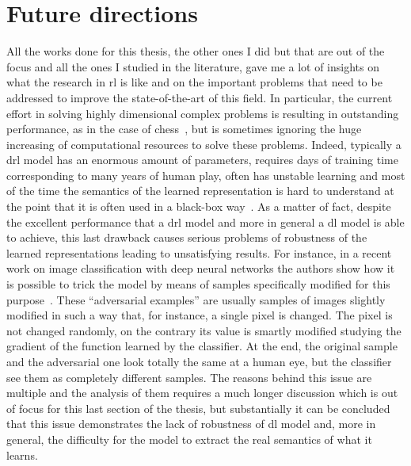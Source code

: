 \section{Future directions}
All the works done for this thesis, the other ones I did but that are out of the focus and all the ones I studied in the literature, gave me a lot of insights on what the research in \gls{rl} is like and on the important problems that need to be addressed to improve the state-of-the-art of this field. In particular, the current effort in solving highly dimensional complex problems is resulting in outstanding performance, as in the case of chess~\cite{silver2017chess}, but is sometimes ignoring the huge increasing of computational resources to solve these problems. Indeed, typically a \gls{drl} model has an enormous amount of parameters, requires days of training time corresponding to many years of human play, often has unstable learning and most of the time the semantics of the learned representation is hard to understand at the point that it is often used in a black-box way~\cite{mnih2015human}. As a matter of fact, despite the excellent performance that a \gls{drl} model and more in general a \gls{dl} model is able to achieve, this last drawback causes serious problems of robustness of the learned representations leading to unsatisfying results. For instance, in a recent work on image classification with deep neural networks the authors show how it is possible to trick the model by means of samples specifically modified for this purpose~\cite{yuan2017adversarial}. These ``adversarial examples'' are usually samples of images slightly modified in such a way that, for instance, a single pixel is changed. The pixel is not changed randomly, on the contrary its value is smartly modified studying the gradient of the function learned by the classifier. At the end, the original sample and the adversarial one look totally the same at a human eye, but the classifier see them as completely different samples. The reasons behind this issue are multiple and the analysis of them requires a much longer discussion which is out of focus for this last section of the thesis, but substantially it can be concluded that this issue demonstrates the lack of robustness of \gls{dl} model and, more in general, the difficulty for the model to extract the real semantics of what it learns.

